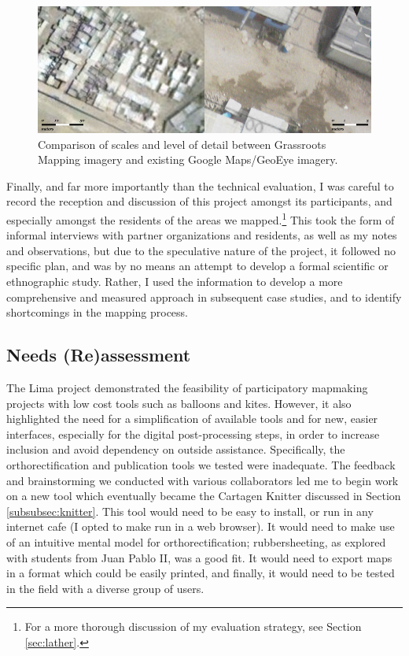 \documentclass[11pt,oneside,notitlepage]{report}
\begin{document}
\begin{figure}[h]
  \begin{center}
	\includegraphics[width=1\textwidth]{diagrams/san-ignacio-scale.jpg}
	\caption{Comparison of scales and level of detail between Grassroots Mapping imagery and existing Google Maps/GeoEye imagery.}
  \end{center}
\end{figure}

Finally, and far more importantly than the technical evaluation, I was careful to record the reception and discussion of this project amongst its participants, and especially amongst the residents of the areas we mapped.\footnote{For a more thorough discussion of my evaluation strategy, see Section \ref{sec:lather}.} This took the form of informal interviews with partner organizations and residents, as well as my notes and observations, but due to the speculative nature of the project, it followed no specific plan, and was by no means an attempt to develop a formal scientific or ethnographic study. Rather, I used the information to develop a more comprehensive and measured approach in subsequent case studies, and to identify shortcomings in the mapping process. 

\subsection{Needs (Re)assessment}

The Lima project demonstrated the feasibility of participatory mapmaking projects with low cost tools such as balloons and kites. However, it also highlighted the need for a simplification of available tools and for new, easier interfaces, especially for the digital post-processing steps, in order to increase inclusion and avoid dependency on outside assistance. Specifically, the orthorectification and publication tools we tested were inadequate. The feedback and brainstorming we conducted with various collaborators led me to begin work on a new tool which eventually became the Cartagen Knitter discussed in Section \ref{subsubsec:knitter}. This tool would need to be easy to install, or run in any internet cafe (I opted to make run in a web browser). It would need to make use of an intuitive mental model for orthorectification; rubbersheeting, as explored with students from Juan Pablo II, was a good fit. It would need to export maps in a format which could be easily printed, and finally, it would need to be tested in the field with a diverse group of users. 
\end{document}
